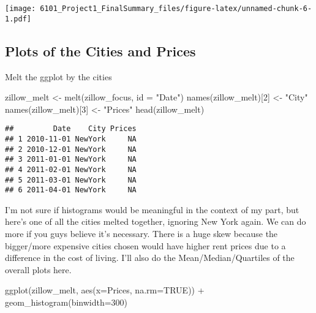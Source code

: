 \documentclass[
]{article}
\newenvironment{Shaded}{\begin{snugshade}}{\end{snugshade}}
\newcommand{\AttributeTok}[1]{\textcolor[rgb]{0.77,0.63,0.00}{#1}}
\newcommand{\ConstantTok}[1]{\textcolor[rgb]{0.00,0.00,0.00}{#1}}
\newcommand{\DecValTok}[1]{\textcolor[rgb]{0.00,0.00,0.81}{#1}}
\newcommand{\FunctionTok}[1]{\textcolor[rgb]{0.00,0.00,0.00}{#1}}
\newcommand{\NormalTok}[1]{#1}
\newcommand{\OtherTok}[1]{\textcolor[rgb]{0.56,0.35,0.01}{#1}}
\newcommand{\SpecialCharTok}[1]{\textcolor[rgb]{0.00,0.00,0.00}{#1}}
\newcommand{\StringTok}[1]{\textcolor[rgb]{0.31,0.60,0.02}{#1}}
\begin{document}
\texttt{[image: 6101\_Project1\_FinalSummary\_files/figure-latex/unnamed-chunk-6-1.pdf]}

\hypertarget{plots-of-the-cities-and-prices}{%
\subsection{Plots of the Cities and
Prices}\label{plots-of-the-cities-and-prices}}

Melt the ggplot by the cities

\begin{Shaded}
\begin{Highlighting}[]
\NormalTok{zillow\_melt }\OtherTok{\textless{}{-}} \FunctionTok{melt}\NormalTok{(zillow\_focus, }\AttributeTok{id =} \StringTok{"Date"}\NormalTok{)}
\FunctionTok{names}\NormalTok{(zillow\_melt)[}\DecValTok{2}\NormalTok{] }\OtherTok{\textless{}{-}} \StringTok{"City"}
\FunctionTok{names}\NormalTok{(zillow\_melt)[}\DecValTok{3}\NormalTok{] }\OtherTok{\textless{}{-}} \StringTok{"Prices"}
\FunctionTok{head}\NormalTok{(zillow\_melt)}
\end{Highlighting}
\end{Shaded}

\begin{verbatim}
##         Date    City Prices
## 1 2010-11-01 NewYork     NA
## 2 2010-12-01 NewYork     NA
## 3 2011-01-01 NewYork     NA
## 4 2011-02-01 NewYork     NA
## 5 2011-03-01 NewYork     NA
## 6 2011-04-01 NewYork     NA
\end{verbatim}

I'm not sure if histograms would be meaningful in the context of my
part, but here's one of all the cities melted together, ignoring New
York again. We can do more if you guys believe it's necessary. There is
a huge skew because the bigger/more expensive cities chosen would have
higher rent prices due to a difference in the cost of living. I'll also
do the Mean/Median/Quartiles of the overall plots here.

\begin{Shaded}
\begin{Highlighting}[]
\FunctionTok{ggplot}\NormalTok{(zillow\_melt, }\FunctionTok{aes}\NormalTok{(}\AttributeTok{x=}\NormalTok{Prices, }\AttributeTok{na.rm=}\ConstantTok{TRUE}\NormalTok{)) }\SpecialCharTok{+} \FunctionTok{geom\_histogram}\NormalTok{(}\AttributeTok{binwidth=}\DecValTok{300}\NormalTok{)}
\end{Highlighting}
\end{Shaded}
\end{document}
